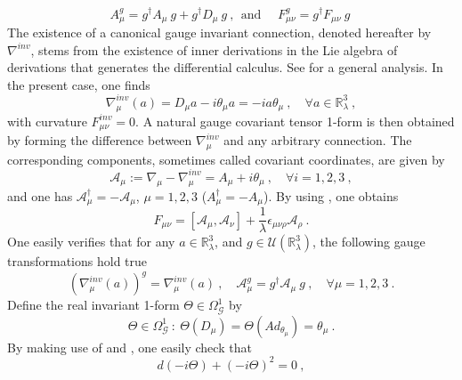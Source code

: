 \documentclass[10pt]{book}
\theoremstyle{break}
\begin{document}
%
\begin{equation*}
A_\mu^g = g^\dag A_\mu \ g + g^\dag D_\mu \ g \ , \ \ \mbox{and } \quad F^g_{\mu\nu} = g^\dag F_{\mu\nu} \ g \ %
\end{equation*}
%
The existence of a canonical gauge invariant connection, denoted hereafter by $\nabla^{inv}$, stems from the existence of inner derivations in the Lie algebra of derivations that generates the differential calculus. See %
for a general analysis. In the present case, one finds
%
\begin{equation*} 
\nabla^{inv}_\mu(a) = D_\mu a - i \theta_\mu a = - i a \theta_\mu \ , \quad \forall a \in \mathbb{R}^3_\lambda \ , %
\end{equation*}
%
with curvature $F^{inv}_{\mu\nu}=0$. A natural gauge covariant tensor 1-form is then obtained by forming the difference between $\nabla^{inv}_\mu$ and any arbitrary connection. The corresponding components, sometimes called covariant coordinates, are given by%
%
\begin{equation*}
\mathcal{A}_\mu := \nabla_\mu - \nabla^{inv}_\mu = A_\mu + i \theta_\mu \ , \quad \forall i=1,2,3 \ , %
\end{equation*}
%
and one has $\mathcal{A}_\mu^\dag = - \mathcal{A}_\mu$, $\mu=1,2,3$ ($A_\mu^\dag=-A_\mu$). By using %
, one obtains%
%
\begin{equation*} 
F_{\mu\nu} = \left[\mathcal{A}_\mu,\mathcal{A}_\nu\right] + \frac{1}{\lambda} \epsilon_{\mu\nu\rho} \mathcal{A}_\rho \ .%
\end{equation*}
%
One easily verifies that for any $a\in\mathbb{R}^3_\lambda$, and $g\in\mathcal{U}(\mathbb{R}^3_\lambda)$, the following gauge transformations hold true%
%
\begin{equation*}
(\nabla^{inv}_\mu(a))^g = \nabla^{inv}_\mu(a) \ , \quad \mathcal{A}^g_\mu = g^\dag \mathcal{A}_\mu \ g \ , \quad \forall \mu=1,2,3 \ . %
\end{equation*}
%
Define the real invariant 1-form $\Theta\in\Omega^1_\mathcal{G}$ by%
%
\begin{equation*}
\Theta \in \Omega^1_\mathcal{G} \ : \ \Theta(D_\mu) = \Theta(Ad_{\theta_\mu}) = \theta_\mu \ .
\end{equation*}
%
By making use of %
and %
, one easily check that%
%
\begin{equation*}
d(-i\Theta)+(-i\Theta)^2=0 \ ,
\end{equation*}
\end{document}
